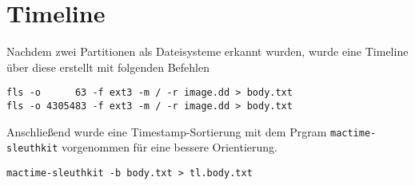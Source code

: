 \section{Timeline}
Nachdem zwei Partitionen als Dateisysteme erkannt wurden, wurde eine Timeline über diese erstellt mit folgenden Befehlen
\begin{verbatim}
fls -o      63 -f ext3 -m / -r image.dd > body.txt
fls -o 4305483 -f ext3 -m / -r image.dd > body.txt
\end{verbatim}
Anschließend wurde eine Timestamp-Sortierung mit dem Prgram \texttt{mactime-sleuthkit} vorgenommen für eine bessere Orientierung.
\begin{verbatim}
mactime-sleuthkit -b body.txt > tl.body.txt
\end{verbatim}